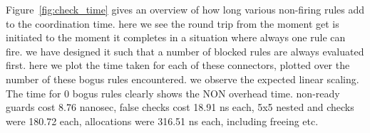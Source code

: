 Figure~\ref{fig:check_time} gives an overview of how long various non-firing rules add to the coordination time. here we see the round trip from the moment get is initiated to the moment it completes in a situation where always one rule can fire. we have designed it such that a number of blocked rules are always evaluated first. here we plot the time taken for each of these connectors, plotted over the number of these bogus rules encountered. we observe the expected linear scaling. The time for 0 bogus rules clearly shows the NON overhead time. non-ready guards cost 8.76 nanosec, false checks cost 18.91 ns each, 5x5 nested and checks were 180.72 each, allocations were 316.51 ns each, including freeing etc.
\begin{figure}
	\centering
\end{figure}
